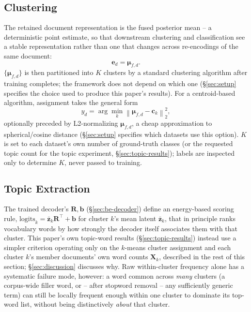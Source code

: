 \documentclass[11pt]{article}
\begin{document}
\subsection{Clustering}
\label{sec:dec}

The retained document representation is the fused posterior mean -- a deterministic point estimate, so that downstream clustering and classification see a stable representation rather than one that changes across re-encodings of the same document:
\begin{equation}
\mathbf{e}_d = \boldsymbol{\mu}_{f,d}.
\label{eq:doc-repr}
\end{equation}
$\{\boldsymbol{\mu}_{f,d}\}$ is then partitioned into $K$ clusters by a standard clustering algorithm after training completes; the framework does not depend on which one (\S\ref{sec:setup} specifies the choice used to produce this paper's results). For a centroid-based algorithm, assignment takes the general form
\begin{equation}
y_d = \arg\min_k \left\|\boldsymbol{\mu}_{f,d}-\mathbf{c}_k\right\|_2^2,
\label{eq:kmeans}
\end{equation}
optionally preceded by L2-normalizing $\boldsymbol{\mu}_{f,d}$, a cheap approximation to spherical/cosine distance (\S\ref{sec:setup} specifies which datasets use this option). $K$ is set to each dataset's own number of ground-truth classes (or the requested topic count for the topic experiment, \S\ref{sec:topic-results}); labels are inspected only to determine $K$, never passed to training.

\subsection{Topic Extraction}
\label{sec:topics}

The trained decoder's $\mathbf{R},\mathbf{b}$ (\S\ref{sec:be-decoder}) define an energy-based scoring rule, $\text{logits}_k=\bar{\mathbf{z}}_k\mathbf{R}^\top+\mathbf{b}$ for cluster $k$'s mean latent $\bar{\mathbf{z}}_k$, that in principle ranks vocabulary words by how strongly the decoder itself associates them with that cluster. This paper's own topic-word results (\S\ref{sec:topic-results}) instead use a simpler criterion operating only on the $k$-means cluster assignment and each cluster $k$'s member documents' own word counts $\mathbf{X}_k$, described in the rest of this section; \S\ref{sec:discussion} discusses why. Raw within-cluster frequency alone has a systematic failure mode, however: a word common across \emph{many} clusters (a corpus-wide filler word, or -- after stopword removal -- any sufficiently generic term) can still be locally frequent enough within one cluster to dominate its top-word list, without being distinctively \emph{about} that cluster.
\end{document}
